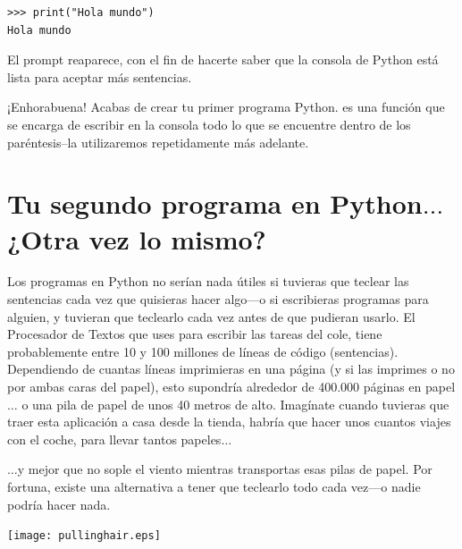 \begin{listing}
\begin{verbatim}
>>> print("Hola mundo")
Hola mundo
\end{verbatim}
\end{listing}

El prompt reaparece, con el fin de hacerte saber que la consola de Python está lista para aceptar más sentencias.

\noindent
¡Enhorabuena! Acabas de crear tu primer programa Python.   es una función que se encarga de escribir en la consola todo lo que se encuentre dentro de los paréntesis--la utilizaremos repetidamente más adelante.

\section{Tu segundo programa en Python$\ldots$¿Otra vez lo mismo?}

Los programas en Python no serían nada útiles si tuvieras que teclear las sentencias cada vez que quisieras hacer algo---o si escribieras programas para alguien, y tuvieran que teclearlo cada vez antes de que pudieran usarlo. 
El Procesador de Textos que uses para escribir las tareas del cole, tiene probablemente entre 10 y 100 millones de líneas de código (sentencias). Dependiendo de cuantas líneas imprimieras en una página (y si las imprimes o no por ambas caras del papel), esto supondría alrededor de 400.000 páginas en papel$\ldots$ o una pila de papel de unos 40 metros de alto.
Imagínate cuando tuvieras que traer esta aplicación a casa desde la tienda, habría que hacer unos cuantos viajes con el coche, para llevar tantos papeles$\ldots$

$\ldots$y mejor que no sople el viento mientras transportas esas pilas de papel. Por fortuna, existe una alternativa a tener que teclearlo todo cada vez---o nadie podría hacer nada.

\begin{center}
\texttt{[image: pullinghair.eps]}
\end{center}


